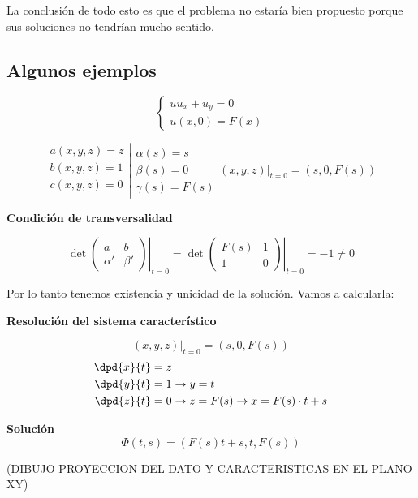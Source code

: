 La conclusión de todo esto es que el problema no estaría bien propuesto porque sus soluciones no tendrían mucho sentido.

\subsection{Algunos ejemplos}

	\begin{example}{1}
		\[\left\{ \begin{array}{l} uu_x + u_y = 0 \\ u(x,0) = F(x) \end{array}\right.\]

		\[ \left.\begin{array}{r}
		a(x,y,z) = z \\
		b(x,y,z) = 1 \\
		c(x,y,z) = 0 \\
		\end{array} \right| \begin{array}{l}
		\alpha(s) = s \\
		\beta(s) = 0 \\
		\gamma(s) = F(s) \end{array}
		(x,y,z)|_{t=0} = (s,0,F(s))
		\]

		\textbf{Condición de transversalidad}

		\[\det \left.\begin{pmatrix}
		a & b \\
		\alpha' & \beta'
		\end{pmatrix} \right|_{t=0}  = \det \left. \begin{pmatrix}
		F(s) & 1 \\
		1 & 0
		\end{pmatrix} \right|_{t=0} = -1 \neq 0\]

		Por lo tanto tenemos existencia y unicidad de la solución. Vamos a calcularla:

		\textbf{Resolución del sistema característico}

		\[ (x,y,z) |_{t=0} = (s,0,F(s)) \]
		\begin{align*}
		\dpd{x}{t} &= z \\
		\dpd{y}{t} &= 1 \rightarrow y = t \\
		\dpd{z}{t} &= 0 \rightarrow z = F(s) \rightarrow x = F(s)\cdot t + s
		\end{align*}


		\textbf{Solución}
		\[\Phi(t,s) = (F(s)t+s, t, F(s))\]


		(DIBUJO PROYECCION DEL DATO Y CARACTERISTICAS EN EL PLANO XY)


\end{example}
